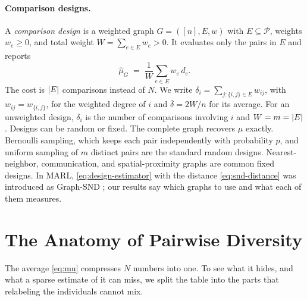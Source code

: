 \documentclass[twoside,11pt]{article}
\DeclarePairedDelimiter{\abs}{\lvert}{\rvert}
\newcommand{\SND}{\mu}
\newcommand{\SNDG}{\widehat{\mu}_{G}}
\newcommand{\Pairs}{\mathcal{P}}
\newcommand{\sigmamain}{\sigma^2_{\mathrm{main}}}
\newcommand{\sigmaint}{\sigma^2_{\mathrm{int}}}
\newcommand{\sigmatot}{\sigma^2_{\mathrm{tot}}}
\begin{document}
\paragraph{Comparison designs.}
A \emph{comparison design} is a weighted graph $G=([n],E,w)$ with
$E\subseteq\Pairs$, weights $w_e\ge 0$, and total weight $W=\sum_{e\in
E}w_e>0$. It evaluates only the pairs in $E$ and reports
\begin{equation}
  \SNDG \;=\; \frac{1}{W}\sum_{e\in E} w_e\, d_e .
  \label{eq:design-estimator}
\end{equation}
The cost is $\abs{E}$ comparisons instead of $N$. We write
$\delta_i=\sum_{j:\{i,j\}\in E} w_{ij}$, with $w_{ij}=w_{\{i,j\}}$, for the weighted degree of $i$ and
$\bar\delta=2W/n$ for its average. For an unweighted design, $\delta_i$ is the
number of comparisons involving $i$ and ${W=m=\abs{E}}$. Designs can be
random or fixed. The complete graph recovers $\SND$ exactly. Bernoulli
sampling, which keeps each pair independently with probability $p$, and
uniform sampling of $m$ distinct pairs are the standard random designs.
Nearest-neighbor, communication, and spatial-proximity graphs are common
fixed designs. In MARL, \eqref{eq:design-estimator} with the distance
\eqref{eq:snd-distance} was introduced as \mbox{Graph-SND} \citep{ray2026graphsnd};
our results say which graphs to use and what each of them measures.

\section{The Anatomy of Pairwise Diversity}
\label{sec:anatomy}

The average \eqref{eq:mu} compresses $N$ numbers into one. To see what it
hides, and what a sparse estimate of it can miss, we split the table
into the parts that relabeling the individuals cannot mix.

\end{document}
